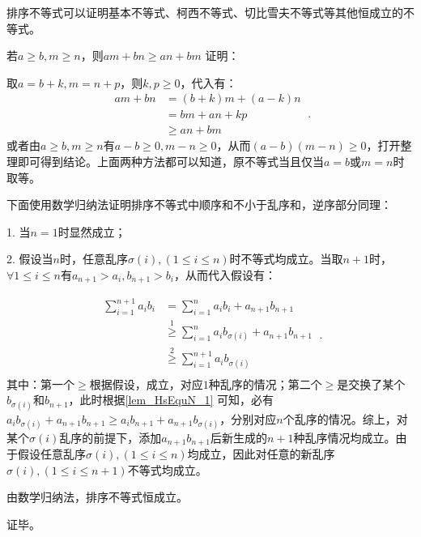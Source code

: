 排序不等式可以证明基本不等式、柯西不等式、切比雪夫不等式等其他恒成立的不等式。

\begin{lemma}{若$a\geq b,m\geq n$，则$am+bn\geq an+bm$}\label{lem_HsEquN_1}
证明：

取$a=b+k,m=n+p$，则$k,p\geq0$，代入有：
\begin{equation}
\begin{split}
am+bn&= (b+k)m+(a-k)n \\ 
&= bm+an+kp \\
&\geq an+bm
\end{split}~.
\end{equation}
或者由$a\geq b,m\geq n$有$a-b\geq 0,m- n\geq0$，从而$(a-b)(m- n)\geq0$，打开整理即可得到结论。上面两种方法都可以知道，原不等式当且仅当$a=b$或$m=n$时取等。
\end{lemma}

下面使用数学归纳法证明排序不等式中顺序和不小于乱序和，逆序部分同理：

1. 当$n=1$时显然成立；

2. 假设当$n$时，任意乱序$\sigma(i),(1\leq i\leq n)$时不等式均成立。当取$n+1$时，$\forall 1\leq i\leq n$有$a_{n+1}>a_i,b_{n+1}>b_i$，从而代入假设有：

\begin{equation}
\begin{split}
\sum_{i=1}^{n+1} a_i b_i&=\sum_{i=1}^n a_i b_i+a_{n+1}b_{n+1}\\
&\overset{\mathrm{1}}{\geq} \sum_{i=1}^n a_i b_{\sigma(i)} +a_{n+1}b_{n+1} \\ 
&\overset{\mathrm{2}}{\geq} \sum_{i=1}^{n+1} a_i b_{\sigma(i)} \\
\end{split}~.
\end{equation}
其中：第一个$\geq$根据假设，成立，对应$1$种乱序的情况；第二个$\geq$是交换了某个$b_{\sigma(i)}$和$b_{n+1}$，此时根据\autoref{lem_HsEquN_1} 可知，必有$a_i b_{\sigma(i)}+a_{n+1}b_{n+1}\geq a_ib_{n+1} +a_{n+1}b_{\sigma(i)}$，分别对应$n$个乱序的情况。综上，对某个$\sigma(i)$乱序的前提下，添加$a_{n+1}b_{n+1}$后新生成的$n+1$种乱序情况均成立。由于假设任意乱序$\sigma(i),(1\leq i\leq n)$均成立，因此对任意的新乱序$\sigma(i),(1\leq i\leq n+1)$不等式均成立。

由数学归纳法，排序不等式恒成立。

证毕。

